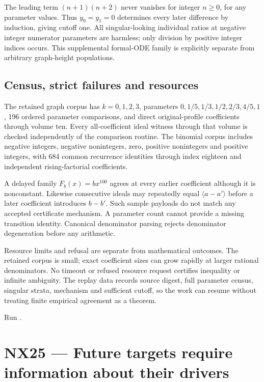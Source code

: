 \documentclass[
  11pt,
  a4paper,
]{report}
\let\singularitytexttt\texttt
\renewcommand{\texttt}[1]{\singularitytexttt{\seqsplit{#1}}}
\begin{document}
The leading term \((n+1)(n+2)\) never vanishes for integer \(n\ge0\),
for any parameter values. Thus \(y_0=y_1=0\) determines every later
difference by induction, giving cutoff one. All singular-looking
individual ratios at negative integer numerator parameters are harmless;
only division by positive integer indices occurs. This supplemental
formal-ODE family is explicitly separate from arbitrary graph-height
populations.

\hypertarget{census-strict-failures-and-resources}{%
\section{Census, strict failures and
resources}\label{census-strict-failures-and-resources}}

The retained graph corpus has \(k=0,1,2,3\), parameters
\(0,1/5,1/3,1/2,2/3,4/5,1\), 196 ordered parameter comparisons, and
direct original-profile coefficients through volume ten. Every
all-coefficient ideal witness through that volume is checked
independently of the comparison routine. The binomial corpus includes
negative integers, negative nonintegers, zero, positive nonintegers and
positive integers, with 684 common recurrence identities through index
eighteen and independent rising-factorial coefficients.

A delayed family \(F_b(x)=b x^{100}\) agrees at every earlier
coefficient although it is nonconstant. Likewise consecutive ideals may
repeatedly equal \(\langle a-a'\rangle\) before a later coefficient
introduces \(b-b'\). Such sample payloads do not match any accepted
certificate mechanism. A parameter count cannot provide a missing
transition identity. Canonical denominator parsing rejects denominator
degeneration before any arithmetic.

Resource limits and refusal are separate from mathematical outcomes. The
retained corpus is small; exact coefficient sizes can grow rapidly at
larger rational denominators. No timeout or refused resource request
certifies inequality or infinite ambiguity. The replay data records
source digest, full parameter census, singular strata, mechanism and
sufficient cutoff, so the work can resume without treating finite
empirical agreement as a theorem.

Run \texttt{python\ scripts/prefix\_certificates.py\ -\/-check}.

\hypertarget{nx25-future-targets-require-information-about-their-drivers}{%
\chapter{NX25 --- Future targets require information about their
drivers}\label{nx25-future-targets-require-information-about-their-drivers}}
\end{document}
